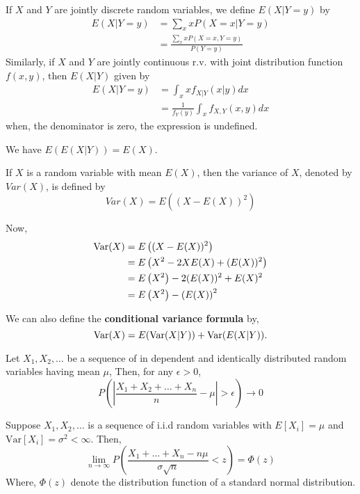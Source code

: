 \begin{definition}
    If $ X $ and $ Y $ are jointly discrete random variables, we define $ E(X|Y=y) $ by
    \begin{align*}
        E(X|Y=y) &= \sum_{x}xP(X=x|Y=y)\\ 
                 &= \frac{\sum_{x}xP(X=x,Y=y) }{P(Y=y)}
    \end{align*}
    Similarly, if $ X $ and $ Y $ are jointly continuous r.v. with joint distribution function $ f(x,y) $, then $ E(X|Y) $ given by
    \begin{align*}
        E(X|Y=y) &= \int_{x} x f_{X|Y}(x|y)dx \\
                 &= \frac{1}{f_Y(y)}\int_{x} f_{X,Y}(x,y)dx 
    \end{align*}
    when, the denominator is zero, the expression is undefined.
\end{definition}

We have $ E\left( E(X|Y) \right) = E(X) $. 

\begin{definition}[Variance]
	If $ X $ is a random variable with mean $ E(X) $, then the variance of $ X $,
	denoted by $ Var(X) $, is defined by
	\[
		Var(X)=E\left( (X-E(X))^{2} \right)
	\]
\end{definition}
Now, 
\begin{align*}
    \text{Var}(X) &= E\left((X-E(X))^{2}\right) \\ 
                &= E\left( X^{2} - 2XE(X) + (E(X))^{2} \right) \\
                &= E\left( X^{2} \right) - 2(E(X))^{2} + E(X)^{2} \\
                &= E\left( X^{2} \right) - \left( E(X) \right)^{2}
\end{align*}

We can also define the \textbf{conditional variance formula} by,
\[
    \text{Var}(X) = E(\text{Var}(X|Y)) + \text{Var}(E(X|Y)).
\]

\begin{theorem}
	Let $X_1,X_2,\ldots$ be a sequence of in dependent and identically distributed 
	random variables having mean $ \mu $, Then, for any $ \epsilon >0 $,
	\[
		P \left( \left|\frac{X_1+X_2+ \ldots + X_n }{n} - \mu \right| > \epsilon \right) \to 0 
	\]
\end{theorem}

\begin{theorem}
	Suppose $X_1, X_2, \ldots  $ is a sequence of i.i.d random variables with 
    $E[X_i]=\mu$ and $\text{Var}[X_i]=\sigma ^{2} < \infty$. Then, 
	\[
		\lim_{n \to \infty} P\left( \frac{X_1+\ldots+X_n - n\mu}{\sigma \sqrt{n} } < z \right) = \Phi(z)
	\]
	Where, $\Phi(z)$ denote the distribution function of a standard normal distribution.
\end{theorem}

